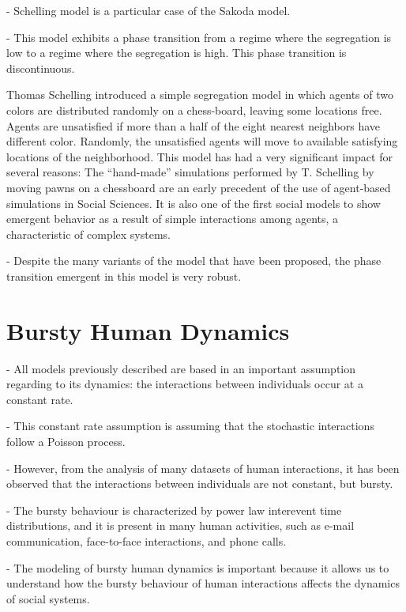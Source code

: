 - Schelling model is a particular case of the Sakoda model.

- This model exhibits a phase transition from a regime where the segregation is low to a regime where the segregation is high. This phase transition is discontinuous. 

Thomas Schelling introduced a simple segregation model   \cite{schelling-1969,Schelling,schellingbook,hegselmann-2017} in which agents of two colors are distributed randomly on a chess-board, leaving some locations free. Agents are unsatisfied if more than a half of the eight nearest neighbors have different color. Randomly, the unsatisfied agents will move to available satisfying locations of the neighborhood. This model has had a very significant impact for several reasons: The ``hand-made'' simulations performed by T. Schelling by moving pawns on a chessboard are an early precedent of the use of  agent-based simulations in Social Sciences. It is also one of the first social models to show emergent behavior as a result of simple interactions among agents, a characteristic of complex systems.

- Despite the many variants of the model that have been proposed, the phase transition emergent in this model is very robust.

\section{\label{sec: Bursty Human Dynamics} Bursty Human Dynamics}

- All models previously described are based in an important assumption regarding to its dynamics: the interactions between individuals occur at a constant rate.

- This constant rate assumption is assuming that the stochastic interactions follow a Poisson process. 

- However, from the analysis of many datasets of human interactions, it has been observed that the interactions between individuals are not constant, but bursty.

- The bursty behaviour is characterized by power law interevent time distributions, and it is present in many human activities, such as e-mail communication, face-to-face interactions, and phone calls.

- The modeling of bursty human dynamics is important because it allows us to understand how the bursty behaviour of human interactions affects the dynamics of social systems.

